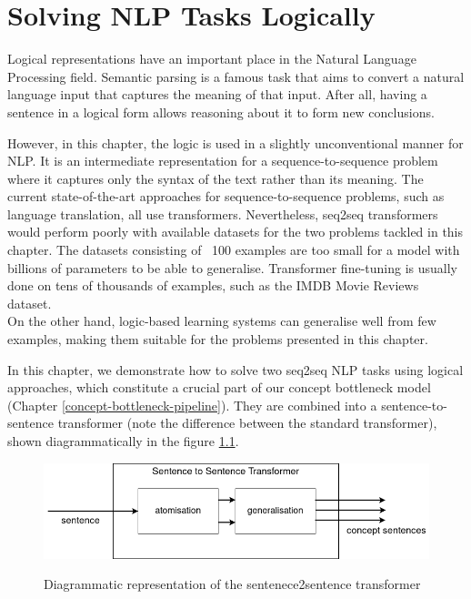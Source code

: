


\chapter{Solving NLP Tasks Logically}
\label{solving-nlp-tasks-logically}


Logical representations have an important place in the Natural Language Processing field.
Semantic parsing \cite{RefWorks:RefID:28-jurafsky2014speech} is a famous task that aims to convert a natural language input that captures the meaning of that input.
After all, having a sentence in a logical form allows reasoning about it to form new conclusions.

However, in this chapter, the logic is used in a slightly unconventional manner for NLP.
It is an intermediate representation for a sequence-to-sequence problem where it captures only the syntax of the text rather than its meaning.
The current state-of-the-art approaches for sequence-to-sequence problems, such as language translation, all use transformers. 
Nevertheless, seq2seq transformers would perform poorly with available datasets for the two problems tackled in this chapter.
The datasets consisting of ~100 examples are too small for a model with billions of parameters to be able to generalise.
Transformer fine-tuning is usually done on tens of thousands of examples, such as the IMDB Movie Reviews dataset. \\
On the other hand, logic-based learning systems can generalise well from few examples, making them suitable for the problems presented in this chapter. 

In this chapter, we demonstrate how to solve two seq2seq NLP tasks using logical approaches, which constitute a crucial part of our concept bottleneck model (Chapter \ref{concept-bottleneck-pipeline}).
They are combined into a sentence-to-sentence transformer (note the difference between the standard transformer), shown diagrammatically in the figure \ref{sentence2sentence-transformer}.

\begin{figure}[h]
\caption{Diagrammatic representation of the sentenece2sentence transformer}
\vspace{10pt}
\centering
\includegraphics[width=\textwidth]{solving-nlp-tasks-logically/sent2sent_transformer.png}
\label{sentence2sentence-transformer}
\end{figure}



